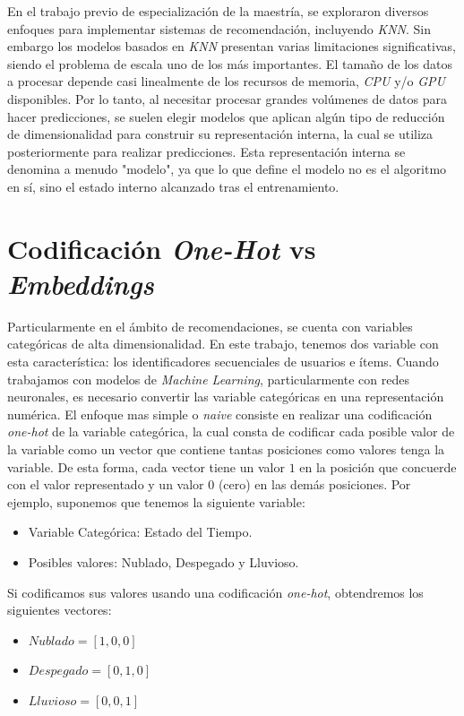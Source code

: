 \documentclass[11pt,a4paper,twoside]{thesis}
\begin{document}
En el trabajo previo de especialización \cite{src} de la maestría, se exploraron diversos enfoques para implementar sistemas de recomendación, incluyendo \textit{KNN}. Sin embargo los modelos basados en \textit{KNN} presentan varias limitaciones significativas, siendo el problema de escala uno de los más importantes. El tamaño de los datos a procesar depende casi linealmente de los recursos de memoria, \textit{CPU} y/o \textit{GPU} disponibles. Por lo tanto, al necesitar procesar grandes volúmenes de datos para hacer predicciones, se suelen elegir modelos que aplican algún tipo de reducción de dimensionalidad para construir su representación interna, la cual se utiliza posteriormente para realizar predicciones. Esta representación interna se denomina a menudo "modelo", ya que lo que define el modelo no es el algoritmo en sí, sino el estado interno alcanzado tras el entrenamiento.

\section{Codificación \textit{One-Hot} vs \textit{Embeddings}}

Particularmente en el ámbito de recomendaciones, se cuenta con variables
categóricas de alta dimensionalidad. En este trabajo, tenemos dos variable
con esta característica: los identificadores secuenciales de usuarios e ítems.
Cuando trabajamos con modelos de \textit{Machine Learning}, particularmente con
redes neuronales, es necesario convertir las variable categóricas en una
representación numérica. El enfoque mas simple o \textit{naive} consiste en
realizar una codificación \textit{one-hot} de la variable categórica, la cual
consta de codificar cada posible valor de la variable como un vector que
contiene tantas posiciones como valores tenga la variable. De esta forma, cada
vector tiene un valor $1$ en la posición que concuerde con el valor
representado y un valor $0$ (cero) en las demás posiciones. Por ejemplo,
suponemos que tenemos la siguiente variable:

\begin{itemize}
	\item Variable Categórica: Estado del Tiempo.
	\item Posibles valores: Nublado, Despegado y Lluvioso.
\end{itemize}

Si codificamos sus valores usando una codificación \textit{one-hot},
obtendremos los siguientes vectores:

\begin{itemize}
	\item $Nublado    = [1, 0, 0]$
	\item $Despegado  = [0, 1, 0]$
	\item $Lluvioso   = [0, 0, 1]$
\end{itemize}
\end{document}
